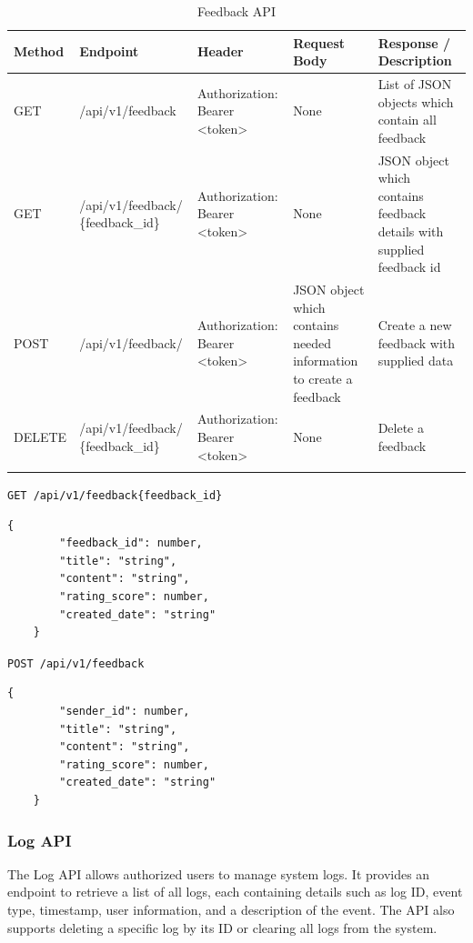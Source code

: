 \begin{longtable}{|m{1.8cm}|m{4.8cm}|m{3cm}|m{3cm}|m{3cm}|}
	\hline
	\textbf{Method} & \textbf{Endpoint} & \textbf{Header}                                                                                                                            & \textbf{Request Body} & \textbf{Response / Description}   \\ \hline
	\endhead
	
	GET & /api/v1/feedback & Authorization: Bearer <token>  & None & List of JSON objects which contain all feedback \\ \hline
	
	GET & /api/v1/feedback/ \newline \{feedback\_id\} & Authorization: Bearer <token>  & None & JSON object which contains feedback details with supplied feedback id\\ \hline
	
	POST & /api/v1/feedback/ & Authorization: Bearer <token>  & JSON object which contains needed information to create a feedback & Create a new feedback with supplied data\\ \hline
	
	DELETE & /api/v1/feedback/ \newline \{feedback\_id\} & Authorization: Bearer <token>  & None & Delete a feedback\\ \hline
	
	
	\caption{Feedback API}
	\label{tab:feedback-api}
	
\end{longtable}

\texttt{GET /api/v1/feedback\{feedback\_id\}}
\begin{lstlisting}[breaklines=true, caption=Feedback Schema]
	{
		"feedback_id": number,
		"title": "string",
		"content": "string",
		"rating_score": number,
		"created_date": "string"
	}
\end{lstlisting}

\newpage

\texttt{POST /api/v1/feedback}
\begin{lstlisting}[breaklines=true, caption=Create a Feedback]
	{
		"sender_id": number,
		"title": "string",
		"content": "string",
		"rating_score": number,
		"created_date": "string"
	}
\end{lstlisting}


\subsubsection{Log API}
The Log API allows authorized users to manage system logs. It provides an endpoint to retrieve a list of all logs, each containing details such as log ID, event type, timestamp, user information, and a description of the event. The API also supports deleting a specific log by its ID or clearing all logs from the system.

